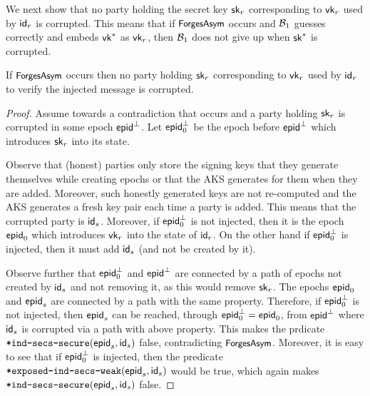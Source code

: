 We next show that no party holding the secret key $\erssk_r$ corresponding to $\ersvk_r$ used by $\id_r$ is corrupted. This means that if $\forgesa$ occurs and $\Bdv[1]$ guesses correctly and embeds $\ersvk^*$ as $\ersvk_r$, then $\Bdv[1]$ does not give up when $\erssk^*$ is corrupted.
\begin{claim}
  If $\forgesa$ occurs then no party holding $\erssk_r$ corresponding to $\ersvk_r$ used by $\id_r$ to verify the injected message is corrupted.
\end{claim}
\begin{proof}
  Assume towards a contradiction that \forgesa occurs and a party holding $\erssk_r$ is corrupted in some epoch $\hgnodeid^\bot$. Let $\hgnodeid_0^\bot$ be the epoch before $\hgnodeid^\bot$ which introduces $\erssk_r$ into its state.

  Observe that (honest) parties only store the signing keys that they generate themselves while creating epochs or that the AKS generates for them when they are added. Moreover, such honestly generated keys are not re-computed and the AKS generates a fresh key pair each time a party is added.
  This means that the corrupted party is $\id_s$. Moreover, if $\hgnodeid_0^\bot$ is not injected, then it is the epoch $\hgnodeid_0$ which introduces $\ersvk_r$ into the state of $\id_r$. On the other hand if $\hgnodeid_0^\bot$ is injected, then it must add $\id_s$ (and not be created by it).

  Observe further that $\hgnodeid_0^\bot$ and $\hgnodeid^\bot$ are connected by a path of epochs not created by $\id_s$ and not removing it, as this would remove $\erssk_r$. The epochs $\hgnodeid_0$ and $\hgnodeid_s$ are connected by a path with the same property. Therefore, if $\hgnodeid_0^\bot$ is not injected, then $\hgnodeid_s$ can be reached, through $\hgnodeid_0^\bot=\hgnodeid_0$, from $\hgnodeid^\bot$ where $\id_s$ is corrupted via a path with above property. This makes the prdicate $\safeIndSecsSecure(\hgnodeid_s, \id_s)$ false, contradicting $\forgesa$.
  Moreover, it is easy to see that if $\hgnodeid_0^\bot$ is injected, then the predicate $\safeWeakAdd(\hgnodeid_s,\id_s)$ would be true, which again makes $\safeIndSecsSecure(\hgnodeid_s, \id_s)$ false.
\end{proof}

